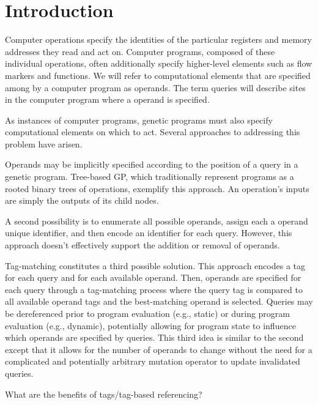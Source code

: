 \section{Introduction}

Computer operations specify the identities of the particular registers and memory addresses they read and act on.
Computer programs, composed of these individual operations, often additionally specify higher-level elements such as flow markers and functions.
We will refer to computational elements that are specified among by a computer program as operands.
The term queries will describe sites in the computer program where a operand is specified.

As instances of computer programs, genetic programs must also specify computational elements on which to act.
Several approaches to addressing this problem have arisen.

Operands may be implicitly specified according to the position of a query in a genetic program.
Tree-based GP, which traditionally represent programs as a rooted binary trees of operations, exemplify this approach.
An operation's inputs are simply the outputs of its child nodes.

A second possibility is to enumerate all possible operands, assign each a operand unique identifier, and then encode an identifier for each query.
However, this approach doesn't effectively support the addition or removal of operands.

Tag-matching constitutes a third possible solution.
This approach encodes a tag for each query and for each available operand.
Then, operands are specified for each query through a tag-matching process where the query tag is compared to all available operand tags and the best-matching operand is selected.
Queries may be dereferenced prior to program evaluation (e.g., static) or during program evaluation (e.g., dynamic), potentially allowing for program state to influence which operands are specified by queries.
This third idea is similar to the second except that it allows for the number of operands to change without the need for a complicated and potentially arbitrary mutation operator to update invalidated queries.

What are the benefits of tags/tag-based referencing?

